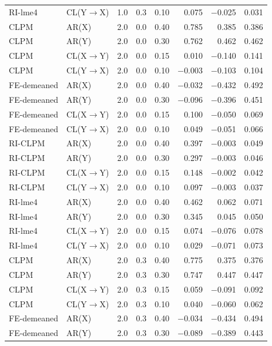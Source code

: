 \documentclass[12pt]{article}
\begin{document}
\begin{table}[H]
\begin{tabular}[t]{llrrrrrr}
RI-lme4 & CL(Y$\rightarrow$X) & 1.0 & 0.3 & 0.10 & 0.075 & $-$0.025 & 0.031\\
CLPM & AR(X) & 2.0 & 0.0 & 0.40 & 0.785 & 0.385 & 0.386\\
\addlinespace
CLPM & AR(Y) & 2.0 & 0.0 & 0.30 & 0.762 & 0.462 & 0.462\\
CLPM & CL(X$\rightarrow$Y) & 2.0 & 0.0 & 0.15 & 0.010 & $-$0.140 & 0.141\\
CLPM & CL(Y$\rightarrow$X) & 2.0 & 0.0 & 0.10 & $-$0.003 & $-$0.103 & 0.104\\
FE-demeaned & AR(X) & 2.0 & 0.0 & 0.40 & $-$0.032 & $-$0.432 & 0.492\\
FE-demeaned & AR(Y) & 2.0 & 0.0 & 0.30 & $-$0.096 & $-$0.396 & 0.451\\
\addlinespace
FE-demeaned & CL(X$\rightarrow$Y) & 2.0 & 0.0 & 0.15 & 0.100 & $-$0.050 & 0.069\\
FE-demeaned & CL(Y$\rightarrow$X) & 2.0 & 0.0 & 0.10 & 0.049 & $-$0.051 & 0.066\\
RI-CLPM & AR(X) & 2.0 & 0.0 & 0.40 & 0.397 & $-$0.003 & 0.049\\
RI-CLPM & AR(Y) & 2.0 & 0.0 & 0.30 & 0.297 & $-$0.003 & 0.046\\
RI-CLPM & CL(X$\rightarrow$Y) & 2.0 & 0.0 & 0.15 & 0.148 & $-$0.002 & 0.042\\
\addlinespace
RI-CLPM & CL(Y$\rightarrow$X) & 2.0 & 0.0 & 0.10 & 0.097 & $-$0.003 & 0.037\\
RI-lme4 & AR(X) & 2.0 & 0.0 & 0.40 & 0.462 & 0.062 & 0.071\\
RI-lme4 & AR(Y) & 2.0 & 0.0 & 0.30 & 0.345 & 0.045 & 0.050\\
RI-lme4 & CL(X$\rightarrow$Y) & 2.0 & 0.0 & 0.15 & 0.074 & $-$0.076 & 0.078\\
RI-lme4 & CL(Y$\rightarrow$X) & 2.0 & 0.0 & 0.10 & 0.029 & $-$0.071 & 0.073\\
\addlinespace
CLPM & AR(X) & 2.0 & 0.3 & 0.40 & 0.775 & 0.375 & 0.376\\
CLPM & AR(Y) & 2.0 & 0.3 & 0.30 & 0.747 & 0.447 & 0.447\\
CLPM & CL(X$\rightarrow$Y) & 2.0 & 0.3 & 0.15 & 0.059 & $-$0.091 & 0.092\\
CLPM & CL(Y$\rightarrow$X) & 2.0 & 0.3 & 0.10 & 0.040 & $-$0.060 & 0.062\\
FE-demeaned & AR(X) & 2.0 & 0.3 & 0.40 & $-$0.034 & $-$0.434 & 0.494\\
\addlinespace
FE-demeaned & AR(Y) & 2.0 & 0.3 & 0.30 & $-$0.089 & $-$0.389 & 0.443\\

\end{tabular}
\end{table}
\end{document}
